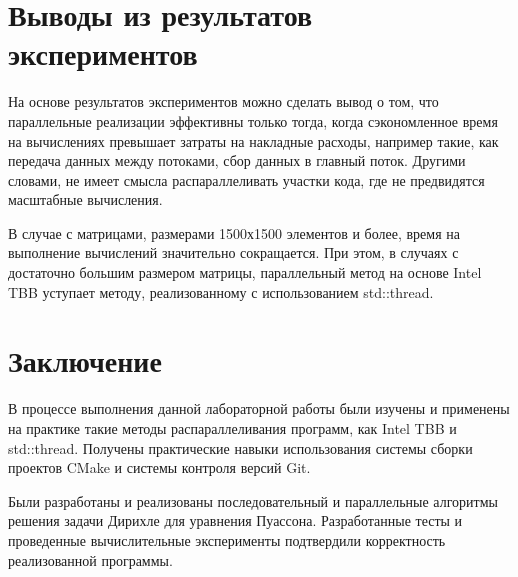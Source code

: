 \documentclass{report}
\begin{document}
\newpage

\section*{Выводы из результатов экспериментов}
\par На основе результатов экспериментов можно сделать вывод о том, что параллельные реализации эффективны только тогда, когда сэкономленное время на вычислениях превышает затраты на накладные расходы, например такие, как передача данных между потоками, сбор данных в главный поток. Другими словами, не имеет смысла распараллеливать участки кода, где не предвидятся масштабные вычисления.
\par В случае с матрицами, размерами 1500х1500 элементов и более, время на выполнение вычислений значительно сокращается. При этом, в случаях с достаточно большим размером матрицы, параллельный метод на основе Intel TBB уступает методу, реализованному с использованием std::thread.
\newpage

\section*{Заключение}
\par В процессе выполнения данной лабораторной работы были изучены и применены на практике такие методы распараллеливания программ, как Intel TBB и std::thread. Получены практические навыки использования системы сборки проектов CMake и системы контроля версий Git. 
\par Были разработаны и реализованы последовательный и параллельные алгоритмы решения задачи Дирихле для уравнения Пуассона. Разработанные тесты и проведенные вычислительные эксперименты подтвердили корректность реализованной программы.
\newpage

\end{document}
